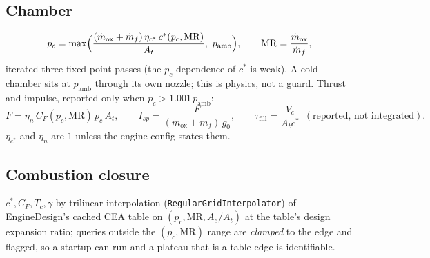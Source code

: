 \documentclass[11pt,a4paper]{article}
\newcommand{\mdot}{\dot{m}}
\newcommand{\code}[1]{\texttt{#1}}
\begin{document}
\subsection{Chamber}
\begin{equation}
  p_c = \max\Bigl(\frac{(\mdot_{\mathrm{ox}}+\mdot_f)\,\eta_{c^*}\,c^*(p_c,\mathrm{MR})}{A_t},\ p_{\mathrm{amb}}\Bigr),
  \qquad \mathrm{MR}=\frac{\mdot_{\mathrm{ox}}}{\mdot_f},
  \label{eq:pc}
\end{equation}
iterated three fixed-point passes (the $p_c$-dependence of $c^*$ is weak). A
cold chamber sits at $p_{\mathrm{amb}}$ through its own nozzle; this is physics,
not a guard. Thrust and impulse, reported only when $p_c>1.001\,p_{\mathrm{amb}}$:
\begin{equation}
  F = \eta_n\,C_F(p_c,\mathrm{MR})\,p_c\,A_t,\qquad
  I_{sp}=\frac{F}{(\mdot_{\mathrm{ox}}+\mdot_f)\,g_0},\qquad
  \tau_{\mathrm{fill}} = \frac{V_c}{A_tc^*}\ \ (\text{reported, not integrated}).
\end{equation}
$\eta_{c^*}$ and $\eta_n$ are $1$ unless the engine config states them.

\subsection{Combustion closure}
$c^*,C_F,T_c,\gamma$ by trilinear interpolation (\code{RegularGridInterpolator})
of EngineDesign's cached CEA table on $(p_c,\mathrm{MR},A_e/A_t)$ at the
table's design expansion ratio; queries outside the $(p_c,\mathrm{MR})$ range
are \emph{clamped} to the edge and flagged, so a startup can run and a plateau
that is a table edge is identifiable.
\end{document}
